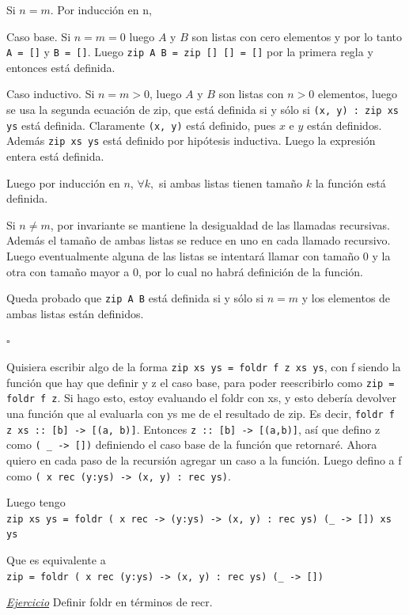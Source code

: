 \documentclass[12pt]{extarticle}
\def\ejercicio{\textit{\underline{Ejercicio} }}
\newcommand\hsline[1]{\texttt{#1}}
\begin{document}
Si $n = m$. Por inducción en n,

Caso base. Si $n = m = 0$ luego $A$ y $B$ son listas con cero elementos y por lo tanto \hsline{A = []} y \hsline{B = []}. Luego \hsline{zip A B = zip [] [] = []} por la primera regla y entonces está definida.

Caso inductivo. Si $n = m > 0$, luego $A$ y $B$ son listas con $n > 0$ elementos, luego se usa la segunda ecuación de zip, que está definida si y sólo si \hsline{(x, y) : zip xs ys} está definida. Claramente \hsline{(x, y)} está definido, pues $x$ e $y$ están definidos. Además \hsline{zip xs ys} está definido por hipótesis inductiva. Luego la expresión entera está definida.

Luego por inducción en $n$, $\forall k,$ si ambas listas tienen tamaño $k$ la función está definida.

Si $n \neq m$, por invariante se mantiene la desigualdad de las llamadas recursivas. Además el tamaño de ambas listas se reduce en uno en cada llamado recursivo. Luego eventualmente alguna de las listas se intentará llamar con tamaño 0 y la otra con tamaño mayor a 0, por lo cual no habrá definición de la función.

Queda probado que \hsline{zip A B} está definida si y sólo si $n = m$ y los elementos de ambas listas están definidos.
\begin{flushright}
$\square$
\end{flushright}

Quisiera escribir algo de la forma \hsline{zip xs ys = foldr f z xs ys}, con f siendo la función que hay que definir y z el caso base, para poder reescribirlo como \hsline{zip = foldr f z}. Si hago esto, estoy evaluando el foldr con xs, y esto debería devolver una función que al evaluarla con ys me de el resultado de zip. Es decir, \hsline{foldr f z xs :: [b] -> [(a, b)]}. Entonces \hsline{z :: [b] -> [(a,b)]}, así que defino z como \hsline{(\ _ -> [])} definiendo el caso base de la función que retornaré. Ahora quiero en cada paso de la recursión agregar un caso a la función. Luego defino a f como \hsline{(\ x rec (y:ys) -> (x, y) : rec ys)}.

Luego tengo \\
\hsline{zip xs ys = foldr (\ x rec -> (y:ys) -> (x, y) : rec ys) (_ -> []) xs ys}

Que es equivalente a \\
\hsline{zip = foldr (\ x rec (y:ys) -> (x, y) : rec ys) (_ -> [])}

\ejercicio Definir foldr en términos de recr.
\end{document}
